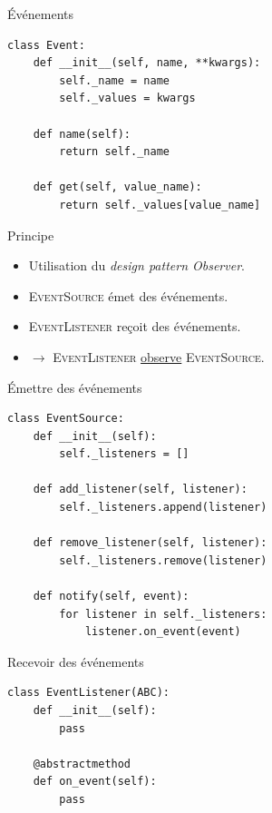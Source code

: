 \begin{frame}[fragile]{Événements}
  \footnotesize
  \begin{verbatim}
class Event:
    def __init__(self, name, **kwargs):
        self._name = name
        self._values = kwargs

    def name(self):
        return self._name

    def get(self, value_name):
        return self._values[value_name]
  \end{verbatim}
  \begin{block}{Principe}
    \begin{itemize}
    \item Utilisation du \textit{design pattern Observer}.
    \item \textsc{EventSource} émet des événements.
    \item \textsc{EventListener} reçoit des événements.
    \item $\rightarrow$ \textsc{EventListener} \underline{observe}
      \textsc{EventSource}.
    \end{itemize}
    
  \end{block}
\end{frame}

\begin{frame}[fragile]{Émettre des événements}
  \footnotesize
  \begin{verbatim}
class EventSource:
    def __init__(self):
        self._listeners = []

    def add_listener(self, listener):
        self._listeners.append(listener)

    def remove_listener(self, listener):
        self._listeners.remove(listener)

    def notify(self, event):
        for listener in self._listeners:
            listener.on_event(event)
  \end{verbatim}
\end{frame}

\begin{frame}[fragile]{Recevoir des événements}
  \footnotesize
  \begin{verbatim}
class EventListener(ABC):
    def __init__(self):
        pass

    @abstractmethod
    def on_event(self):
        pass
  \end{verbatim}
\end{frame}

